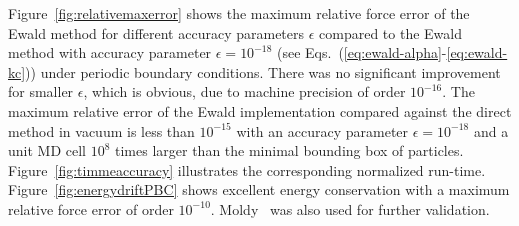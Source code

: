 \documentclass[11pt]{article}
\begin{document}
Figure~\ref{fig:relativemaxerror} shows the maximum relative force
error of the Ewald method for different accuracy parameters $\epsilon$
compared to the Ewald method with accuracy parameter $\epsilon =
10^{-18}$ (see Eqs.\ (\ref{eq:ewald-alpha}-\ref{eq:ewald-kc})) under
periodic boundary conditions. There was no significant improvement for
smaller $\epsilon$, which is obvious, due to machine precision of
order $10^{-16}$. The maximum relative error of the Ewald
implementation compared against the direct method in vacuum is less
than $10^{-15}$ with an accuracy parameter $\epsilon = 10^{-18}$ and a
unit MD cell $10^8$ times larger than the minimal bounding box of
particles. Figure~\ref{fig:timmeaccuracy} illustrates the
corresponding normalized run-time. Figure~\ref{fig:energydriftPBC}
shows  excellent energy conservation with a maximum relative force
error of order $10^{-10}$. Moldy~\cite{Refs00} was also used for
further validation.
\end{document}
